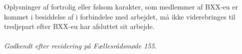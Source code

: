 
Oplysninger af fortrolig eller følsom karakter, som medlemmer af BXX-eu er kommet i besiddelse af i forbindelse med arbejdet, må ikke viderebringes til tredjepart efter BXX-eu har afsluttet sit arbejde. 
\\
\\
\textit{Godkendt efter revidering på Fællesrådsmøde 155.}
